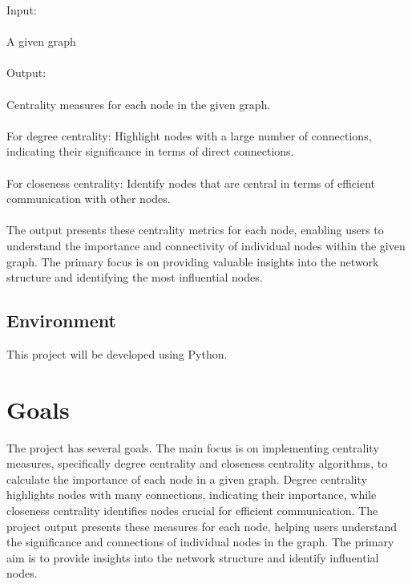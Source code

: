 \documentclass{article}
\begin{document}
Input:\\\\
A given graph\\\\
Output:
\\\\
Centrality measures for each node in the given graph.\\\\
For degree centrality: Highlight nodes with a large number of connections, indicating their significance in terms of direct connections.\\\\
For closeness centrality: Identify nodes that are central in terms of efficient communication with other nodes.\\\\
The output presents these centrality metrics for each node, enabling users to understand the importance and connectivity of individual nodes within the given graph. The primary focus is on providing valuable insights into the network structure and identifying the most influential nodes.\\


\subsection{Environment}

This project will be developed using Python.


\section{Goals}

The project has several goals. The main focus is on implementing centrality measures, specifically degree centrality and closeness centrality algorithms, to calculate the importance of each node in a given graph. Degree centrality highlights nodes with many connections, indicating their importance, while closeness centrality identifies nodes crucial for efficient communication. The project output presents these measures for each node, helping users understand the significance and connections of individual nodes in the graph. The primary aim is to provide insights into the network structure and identify influential nodes.
\end{document}
